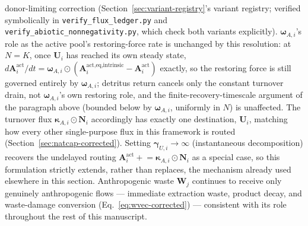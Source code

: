\documentclass[twocolumn,10pt]{article}
\begin{document}
donor-limiting correction (Section~\ref{sec:variant-registry}'s variant registry; verified symbolically in \texttt{verify\_flux\_ledger.py} and \texttt{verify\_abiotic\_nonnegativity.py}, which check both variants explicitly). $\boldsymbol\omega_{A,i}$'s role as the active pool's restoring-force rate is unchanged by this resolution: at $N=K$, once $\mathbf U_i$ has reached its own steady state, $d\mathbf A^{\text{act}}_i/dt=\boldsymbol\omega_{A,i}\odot(\mathbf A^{\text{act,eq,intrinsic}}_i-\mathbf A^{\text{act}}_i)$ exactly, so the restoring force is still governed entirely by $\boldsymbol\omega_{A,i}$; detritus return cancels only the constant turnover drain, not $\boldsymbol\omega_{A,i}$'s own restoring role, and the finite-recovery-timescale argument of the paragraph above (bounded below by $\boldsymbol\omega_{A,i}$, uniformly in $N$) is unaffected. The turnover flux $\boldsymbol\kappa_{A,i}\odot\mathbf N_i$ accordingly has exactly one destination, $\mathbf U_i$, matching how every other single-purpose flux in this framework is routed (Section~\ref{sec:natcap-corrected}). Setting $\boldsymbol\gamma_{U,i}\to\infty$ (instantaneous decomposition) recovers the undelayed routing $\mathbf A^{\text{act}}_i\mathrel{+}=\boldsymbol\kappa_{A,i}\odot\mathbf N_i$ as a special case, so this formulation strictly extends, rather than replaces, the mechanism already used elsewhere in this section. Anthropogenic waste $\mathbf W_j$ continues to receive only genuinely anthropogenic flows --- immediate extraction waste, product decay, and waste-damage conversion (Eq.~\eqref{eq:wvec-corrected}) --- consistent with its role throughout the rest of this manuscript.
\end{document}
